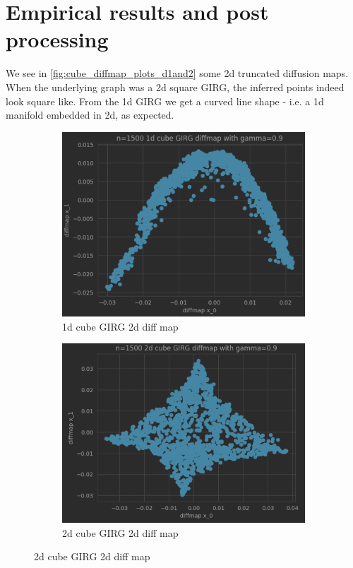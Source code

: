 \section{Empirical results and post processing}
We see in \cref{fig:cube_diffmap_plots_d1and2} some 2d truncated diffusion maps. When the underlying graph was a 2d square GIRG, the inferred points indeed look square like. From the 1d GIRG we get a curved line shape - i.e. a 1d manifold embedded in 2d, as expected.

\begin{figure}
  \centering

  \begin{subfigure}{0.49\textwidth}
    \centering
    \includegraphics[width=\linewidth]{figures/1d_GIRG_diffmap.png}
    \caption{1d cube GIRG 2d diff map}
    \label{fig:sub1}
  \end{subfigure}
  \hfill
  \begin{subfigure}{0.49\textwidth}
    \centering
    \includegraphics[width=\linewidth]{figures/2d_GIRG_diffmap.png}
    \caption{2d cube GIRG 2d diff map}
    \label{fig:cube_diffmap_plots_d2}
  \end{subfigure}



\end{figure}
